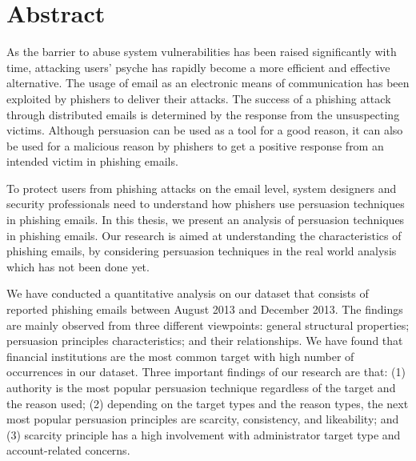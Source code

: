 \begingroup
\let\clearpage\relax
\let\cleardoublepage\relax



\chapter*{Abstract}

As the barrier to abuse system vulnerabilities has been raised significantly
with time, attacking users' psyche has rapidly become a more efficient
and effective alternative. The usage of email as an electronic means
of communication has been exploited by phishers to deliver their attacks.
The success of a phishing attack through distributed emails is determined
by the response from the unsuspecting victims. Although persuasion
can be used as a tool for a good reason, it can also be used for a
malicious reason by phishers to get a positive response from an intended
victim in phishing emails.

To protect users from phishing attacks on the email level, system
designers and security professionals need to understand how phishers
use persuasion techniques in phishing emails. In this thesis, we present
an analysis of persuasion techniques in phishing emails. Our research
is aimed at understanding the characteristics of phishing emails,
by considering persuasion techniques in the real world analysis which
has not been done yet. 

We have conducted a quantitative analysis on our dataset that consists
of reported phishing emails between August 2013 and December 2013.\foreignlanguage{english}{
The findings are mainly observed from three different viewpoints:
general structural properties; persuasion principles characteristics;
and their relationships}. We have found that financial institutions
are the most common target with high number of occurrences in our
dataset. \foreignlanguage{english}{Three important findings of our
research are that: (1) authority is the most popular persuasion technique
regardless of the target and the reason used; (2) depending on the
target types and the reason types, the next most popular persuasion
principles are scarcity, consistency, and likeability; and (3) scarcity
principle has a high involvement with administrator target type and
account-related concerns.}

\vfill{}


\endgroup
